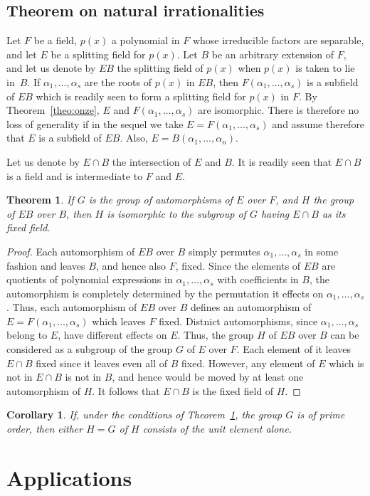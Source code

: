 \documentclass[10pt,leqno]{article}
\newtheorem{theo}{Theorem}
\newtheorem*{coro*}{Corollary}
\theoremstyle{definition}
\begin{document}
\subsection{Theorem on natural irrationalities}

Let $F$ be a field, $p(x)$ a polynomial in $F$ whose irreducible factors are separable, and let $E$ be a splitting field for $p(x)$.
Let $B$ be an arbitrary extension of $F$, and let us denote by $EB$ the splitting field of $p(x)$ when $p(x)$ is taken to lie in~$B$.
If $\alpha_1, \ldots, \alpha_s$ are the roots of $p(x)$ in $EB$, then $F(\alpha_1, \ldots, \alpha_s)$ is a subfield of $EB$ which is readily seen to form a splitting field for $p(x)$ in $F$.
By Theorem~\ref{theo:onze}, $E$ and $F(\alpha_1,\ldots,\alpha_s)$ are isomorphic.
There is therefore no loss of generality if in the sequel we take $E = F(\alpha_1,\ldots,\alpha_s)$ and assume therefore that $E$ is a subfield of $EB$.
Also, $E = B(\alpha_1, \ldots, \alpha_n)$.

Let us denote by $E \cap B$ the intersection of $E$ and $B$.
It is readily seen that $E \cap B$ is a field and is intermediate to $F$ and $E$.


\begin{theo}
\label{theo:29}
If $G$ is the group of automorphisms of $E$ over $F$, and $H$ the group of $EB$ over $B$, then $H$ is isomorphic to the subgroup of $G$ having $E \cap B$ as its fixed field.
\end{theo}


\begin{proof}
Each automorphism of $EB$ over $B$ simply permutes $\alpha_1, \ldots, \alpha_s$ in some fashion and leaves $B$, and hence also $F$, fixed.
Since the elements of $EB$ are quotients of polynomial expressions in $\alpha_1, \ldots, \alpha_s$ with coefficients in $B$, the automorphism is completely determined by the permutation it effects on $\alpha_1, \ldots, \alpha_s$.
Thus, each automorphism of $EB$ over $B$ defines an automorphism of $E = F(\alpha_1,\ldots,\alpha_s)$ which leaves $F$ fixed.
Distnict automorphisms, since $\alpha_1, \ldots, \alpha_s$ belong to $E$, have different effects on $E$.
Thus, the group $H$ of $EB$ over $B$ can be considered as a subgroup of the group $G$ of $E$ over $F$.
Each element of it leaves $E \cap B$ fixed since it leaves even all of $B$ fixed.
However, any element of $E$ which is not in $E \cap B$ is not in $B$, and hence would be moved by at least one automorphism of $H$.
It follows that $E \cap B$ is the fixed field of $H$.
\end{proof}


\begin{coro*}
If, under the conditions of Theorem~\ref{theo:29}, the group $G$ is of prime order, then either $H = G$ of $H$ consists of the unit element alone.
\end{coro*}




\section{Applications}
\end{document}
